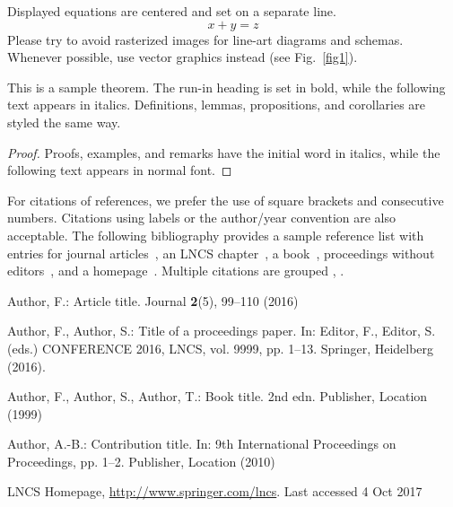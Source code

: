 \documentclass[runningheads]{llncs}
\begin{document}
\noindent Displayed equations are centered and set on a separate
line.
\begin{equation}
x + y = z
\end{equation}
Please try to avoid rasterized images for line-art diagrams and
schemas. Whenever possible, use vector graphics instead (see
Fig.~\ref{fig1}).


\begin{theorem}
This is a sample theorem. The run-in heading is set in bold, while
the following text appears in italics. Definitions, lemmas,
propositions, and corollaries are styled the same way.
\end{theorem}
%
%
\begin{proof}
Proofs, examples, and remarks have the initial word in italics,
while the following text appears in normal font.
\end{proof}
For citations of references, we prefer the use of square brackets
and consecutive numbers. Citations using labels or the author/year
convention are also acceptable. The following bibliography provides
a sample reference list with entries for journal
articles~\cite{ref_article1}, an LNCS chapter~\cite{ref_lncs1}, a
book~\cite{ref_book1}, proceedings without editors~\cite{ref_proc1},
and a homepage~\cite{ref_url1}. Multiple citations are grouped
\cite{ref_article1,ref_lncs1,ref_book1},
\cite{ref_article1,ref_book1,ref_proc1,ref_url1}.
%
%
%
% 
% 
%
\begin{thebibliography}{8}
Author, F.: Article title. Journal \textbf{2}(5), 99--110 (2016)

Author, F., Author, S.: Title of a proceedings paper. In: Editor,
F., Editor, S. (eds.) CONFERENCE 2016, LNCS, vol. 9999, pp. 1--13.
Springer, Heidelberg (2016). 

Author, F., Author, S., Author, T.: Book title. 2nd edn. Publisher,
Location (1999)

Author, A.-B.: Contribution title. In: 9th International Proceedings
on Proceedings, pp. 1--2. Publisher, Location (2010)

LNCS Homepage, \url{http://www.springer.com/lncs}. Last accessed 4
Oct 2017
\end{thebibliography}
\end{document}
